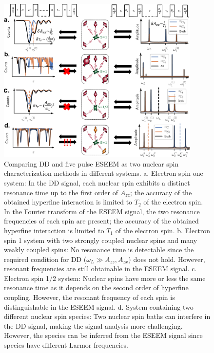 \documentclass[%
 reprint,
superscriptaddress,
 amsmath,amssymb,
 aps,
]{revtex4-2}
\begin{document}
\begin{figure}%
	\begin{center}
		\includegraphics[width=0.9\textwidth]{figure_0.pdf}
		\caption{Comparing DD and five pulse ESEEM as two nuclear spin characterization methods in different systems. a. Electron spin one system: In the DD signal, each nuclear spin exhibits a distinct resonance time up to the first order of $A_{zz}$; the accuracy of the obtained hyperfine interaction is limited to $T_2$ of the electron spin. In the Fourier transform of the ESEEM signal, the two resonance frequencies of each spin are present; the accuracy of the obtained hyperfine interaction is limited to $T_1$ of the electron spin. b. Electron spin 1 system with two strongly coupled nuclear spins and many weakly coupled spins: No resonance time is detectable since the required condition for DD ($\omega_L \gg A_{zz}, A_{zx}$) does not hold. However, resonant frequencies are still obtainable in the ESEEM signal. c. Electron spin 1/2 system: Nuclear spins have more or less the same resonance time as it depends on the second order of hyperfine coupling. However, the resonant frequency of each spin is distinguishable in the ESEEM signal. d. System containing two different nuclear spin species: Two nuclear spin baths can interfere in the DD signal, making the signal analysis more challenging. However, the species can be inferred from the ESEEM signal since species have different Larmor frequencies.}
		\label{fig:1}
	\end{center}
\end{figure}
\end{document}
